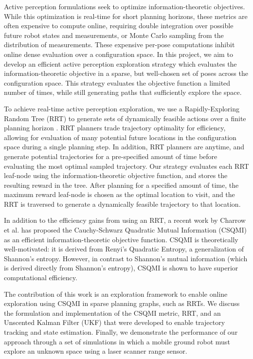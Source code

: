 Active perception formulations seek to optimize information-theoretic
objectives. While this optimization is real-time for short planning horizons,
these metrics are often expensive to compute online, requiring double
integration over possible future robot states and measurements, or Monte Carlo sampling
from the distribution of measurements. These expensive per-pose computations inhibit
online dense evaluation over a configuration space. In this project, we aim to develop an
efficient active perception exploration strategy which evaluates the
information-theoretic objective in a sparse, but well-chosen set of poses across the
configuration space. This strategy evaluates the objective function
a limited number of times, while still generating paths that sufficiently explore the space.

To achieve real-time active perception exploration, we use a Rapidly-Exploring Random Tree
(RRT) to generate sets of dynamically feasible actions over a finite planning horizon
\cite{Kuwata09_TCST}. RRT planners trade trajectory optimality for efficiency, allowing for evaluation
of many potential future locations in the configuration space during a single planning
step. In addition, RRT planners are anytime, and generate potential trajectories
for a pre-specified amount of time before evaluating the most optimal sampled trajectory. Our
strategy evaluates each RRT leaf-node using the information-theoretic objective function,
and stores the resulting reward in the tree. After planning for a specified
amount of time, the maximum reward leaf-node is chosen as the optimal location to
visit, and the RRT is traversed to generate a dynamically feasible trajectory to
that location.

In addition to the efficiency gains from using an RRT, a recent work by Charrow
et al. \cite{charrow15} has
proposed the Cauchy-Schwarz Quadratic Mutual Information (CSQMI) as an efficient
information-theoretic objective function. CSQMI is theoretically
well-motivated: it is derived from Renyi's Quadratic Entropy, a generalization of Shannon's entropy.
However, in contrast to Shannon's mutual information (which is derived directly
from Shannon's entropy), CSQMI is shown to have superior computational efficiency.

The contribution of this work is an exploration framework to enable online exploration using CSQMI in sparse
planning graphs, such as RRTs. 
We discuss the
formulation and implementation of the CSQMI metric, RRT, and an Unscented Kalman Filter (UKF) that were developed to enable trajectory tracking and
state estimation.
Finally, we demonstrate the performance of our approach
through a set of simulations in which a mobile ground
robot must explore an unknown space using a laser scanner range sensor.


